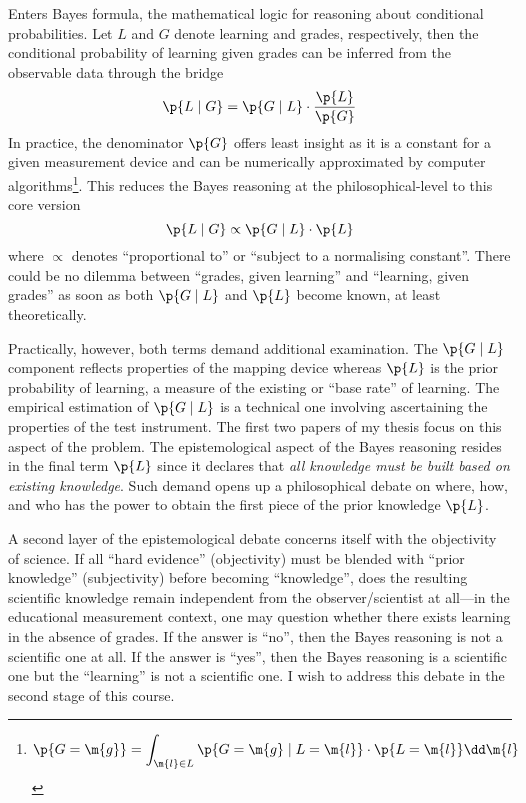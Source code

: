 \documentclass[
    a4paper,                %
    11pt,                   %
    stu,                    %
    floatsintext,           %
    biblatex,               %
    colorlinks=true,        %
    linkcolor=red,          %
    anchorcolor=black,      %
    citecolor=blue,         %
    urlcolor=blue,          %
    bookmarks=true,         %
    bookmarksopen=false,    %
    bookmarksnumbered=true, %
    dvipsnames              %
]{apa7}
\begin{document}
Enters Bayes formula, the mathematical logic for reasoning about conditional probabilities. Let $L$ and $G$ denote learning and grades, respectively, then the conditional probability of learning given grades can be inferred from the observable data through the bridge
\[ \p{ L \mid G } = \p{ G \mid L} \cdot \frac{ \p{L} }{ \p{G} } \]
In practice, the denominator $\p{G}$ offers least insight as it is a constant for a given measurement device and can be numerically approximated by computer algorithms\footnote{
    \[ \p{G=\m{g}} = \int_{\m{l} \in L} \p{ G=\m{g} \mid L=\m{l}} \cdot \p{L=\m{l}} \dd \m{l} \]
}. This reduces the Bayes reasoning at the philosophical-level to this core version
\[ \p{ L \mid G } \propto \p{ G \mid L} \cdot \p{L} \]
where $\propto$ denotes ``proportional to'' or ``subject to a normalising constant''. There could be no dilemma between ``grades, given learning'' and ``learning, given grades'' as soon as both $\p{ G \mid L}$ and $\p{L}$ become known, at least theoretically.

Practically, however, both terms demand additional examination. The $\p{G \mid L}$ component reflects properties of the mapping device whereas $\p{L}$ is the prior probability of learning, a measure of the existing or ``base rate'' of learning. The empirical estimation of $\p{G \mid L}$ is a technical one involving ascertaining the properties of the test instrument. The first two papers of my thesis focus on this aspect of the problem. The epistemological aspect of the Bayes reasoning resides in the final term $\p{L}$ since it declares that \emph{all knowledge must be built based on existing knowledge}. Such demand opens up a philosophical debate on where, how, and who has the power to obtain the first piece of the prior knowledge $\p{L}$.

A second layer of the epistemological debate concerns itself with the objectivity of science. If all ``hard evidence'' (objectivity) must be blended with ``prior knowledge'' (subjectivity) before becoming ``knowledge'', does the resulting scientific knowledge remain independent from the observer/scientist at all---in the educational measurement context, one may question whether there exists learning in the absence of grades. If the answer is ``no'', then the Bayes reasoning is not a scientific one at all. If the answer is ``yes'', then the Bayes reasoning is a scientific one but the ``learning'' is not a scientific one. I wish to address this debate in the second stage of this course.

\printbibliography
\end{document}
